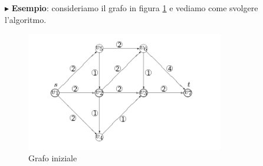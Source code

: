 \documentclass[11pt]{book}
\begin{document}
\vspace{11pt} $\blacktriangleright$ {\bf Esempio}: consideriamo il
grafo in figura \ref{cap7figura78} e vediamo come svolgere l'algoritmo.

\begin{figure}[h!]
  \centering
  \includegraphics[width=0.77\textwidth]{images/cap7figura78.png}
  \caption{Grafo iniziale}
  \label{cap7figura78}
\end{figure}
\end{document}
